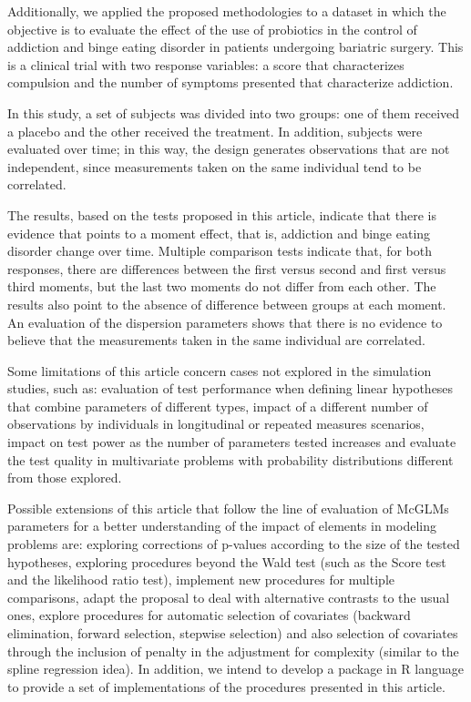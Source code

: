 \documentclass[Review,sagev,times, doublespace]{sagej}
\begin{document}
Additionally, we applied the proposed methodologies to a dataset in which the objective is to evaluate the effect of the use of probiotics in the control of addiction and binge eating 
disorder in patients undergoing bariatric surgery. This is a clinical trial with two response variables: a score that characterizes compulsion and the number of symptoms presented that characterize addiction.

In this study, a set of subjects was divided into two groups: one of them received a placebo and the other received the treatment. 
In addition, subjects were evaluated over time; in this way, the design generates observations that are not independent, since measurements taken on the same individual tend to be correlated.

The results, based on the tests proposed in this article, indicate that there is evidence that points to a moment effect, that is, addiction and binge eating disorder change over time. 
Multiple comparison tests indicate that, for both responses, there are differences between the first versus second and first versus third moments, but the last two moments do not differ from each other. 
The results also point to the absence of difference between groups at each moment. An evaluation of the dispersion parameters shows that there is no evidence to believe that the measurements taken in the same individual are correlated.

Some limitations of this article concern cases not explored in the simulation studies, such as: evaluation of test performance when defining linear hypotheses that combine parameters of different types, impact of a different number of observations by individuals in longitudinal or repeated measures scenarios, impact on test power as the number of parameters tested increases and evaluate the test quality in multivariate problems with probability distributions different from those explored.

Possible extensions of this article that follow the line of evaluation of McGLMs parameters for a better understanding of the impact of elements in modeling problems are: exploring corrections of p-values according to the size of the tested hypotheses, exploring procedures beyond the Wald test (such as the Score test and the likelihood ratio test), implement new procedures for multiple comparisons, adapt the proposal to deal with alternative contrasts to the usual ones, explore procedures for automatic selection of covariates (backward elimination, forward selection, stepwise selection) and also selection of covariates through the inclusion of penalty in the adjustment for complexity (similar to the spline regression idea). In addition, we intend to develop a package in R language to provide a set of implementations of the procedures presented in this article.
\end{document}
